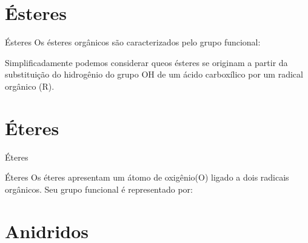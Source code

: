 \documentclass[presentation,professionalfonts,aspectratio=169]{beamer}
\begin{document}
\section{Ésteres}
\label{sec:org0364133}
\begin{mybox}{Ésteres}
Os ésteres orgânicos são caracterizados pelo grupo funcional:
\begin{center}
\end{center}
Simplificadamente podemos considerar queos ésteres
se originam a partir da substituição do hidrogênio do grupo OH de um
ácido carboxílico por um radical orgânico (R).
\end{mybox}


\section{Éteres}
\label{sec:org84734c2}

\begin{frame}[label={sec:org65d58a5}]{Éteres}
\begin{mybox}{Éteres}
Os éteres apresentam um átomo de oxigênio(O) ligado a dois radicais orgânicos.
Seu grupo funcional é representado por:

\begin{center}
\end{center}

\end{mybox}
\end{frame}





\section{Anidridos}
\label{sec:orge732d56}
\end{document}
